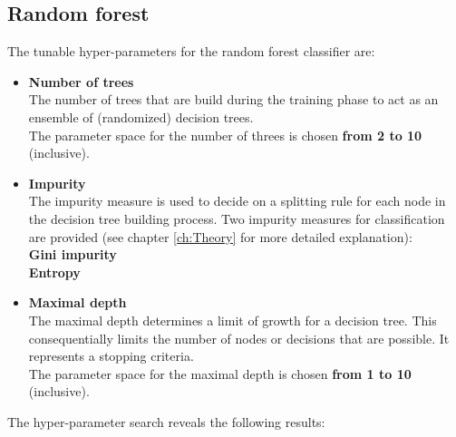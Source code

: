 {{{\subsection*{Random forest}

The tunable hyper-parameters for the random forest classifier are:
\begin{itemize}
\item{\textbf{Number of trees}}\\
The number of trees that are build during the training phase to act as an ensemble of (randomized) decision trees.\\
The parameter space for the number of threes is chosen \textbf{from 2 to 10} (inclusive). 
\item{\textbf{Impurity}}\\
The impurity measure is used to decide on a splitting rule for each node in the decision tree building process.
Two impurity measures for classification are provided (see chapter \ref{ch:Theory} for more detailed explanation):\\
\textbf{Gini impurity}  \\
\textbf{Entropy}
\item{\textbf{Maximal depth}}\\
The maximal depth determines a limit of growth for a decision tree. This consequentially limits the number of nodes or decisions that are possible. It represents a stopping criteria. \\
The parameter space for the maximal depth is chosen \textbf{from 1 to 10} (inclusive). 
\end{itemize}

The hyper-parameter search reveals the following results: \\


}}}
